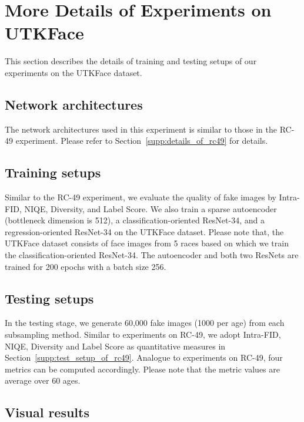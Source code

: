 \documentclass[10pt, twocolumn]{article}
\theoremstyle{definition}
\begin{document}
\section{More Details of Experiments on UTKFace} \label{supp:details_of_utkface}
This section describes the details of training and testing setups of our experiments on the UTKFace dataset. 

\subsection{Network architectures} \label{supp:net_arch_of_utkface_exp}
The network architectures used in this experiment is similar to those in the RC-49 experiment. Please refer to Section~\ref{supp:details_of_rc49} for details. 


\subsection{Training setups} \label{supp:train_setup_of_utkface}
Similar to the RC-49 experiment, we evaluate the quality of fake images by Intra-FID, NIQE, Diversity, and Label Score. We also train a sparse autoencoder (bottleneck dimension is 512), a classification-oriented ResNet-34, and a regression-oriented ResNet-34 on the UTKFace dataset. Please note that, the UTKFace dataset consists of face images from 5 races based on which we train the classification-oriented ResNet-34. The autoencoder and both two ResNets are trained for 200 epochs with a batch size 256.



\subsection{Testing setups} \label{supp:test_setup_of_utkface}
In the testing stage, we generate 60,000 fake images (1000 per age) from each subsampling method. Similar to experiments on RC-49, we adopt Intra-FID, NIQE, Diversity and Label Score as quantitative measures in Section~\ref{supp:test_setup_of_rc49}. 
Analogue to experiments on RC-49, four metrics can be computed accordingly. Please note that the metric values are average over 60 ages. 




\subsection{Visual results}  \label{supp:details_of_utkface_visual_results}
\end{document}
